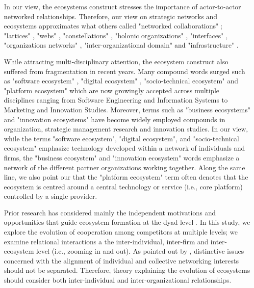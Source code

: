 \documentclass[CHICAGO,Times1COL]{WileyNJDv5} %
\begin{document}
In our view, the ecosystems construct stresses the importance of actor-to-actor networked relationships. Therefore, our view on strategic networks
\citep{jarillo1988strategic,gulati1998alliances,zaheer2000strategic,rusko_2014} and ecosystems \citep{moore1999death,iansiti2004keystone,adner2006match} approximates what
others called "networked collaborations" \citep{normann1993designing}; "lattices" \citep{gore1985lattice}, "webs" \citep{hastings1993new}, "constellations"
\citep{normann1994designing}, "holonic organizations" \citep{mchugh1995beyond}, "interfaces" \citep{gilmore1991innovation}, "organizations networks"
\citep{perrow1972complex}, "inter-organizational domain" \citep{trist1977concept} and "infrastructure" \citep{tilson2010research}.


While attracting multi-disciplinary attention, the ecosystem construct also suffered from fragmentation in recent years. Many compound words surged such as "software ecosystem" \citep{jansen2009sense,jansen2013software}, "digital ecosystem" \citep{eaton2011dynamic},  "socio-technical ecosystem"\citep{ardito2011visual} and  "platform ecosystem" \citep{Tiwana2014} which are now growingly accepted across multiple disciplines ranging from  
Software Engineering and Information Systems to Marketing and Innovation Studies. Moreover, terms such as 
"business ecosystems" \citep{moore1999death,iansiti2004keystone,zahra2012entrepreneurship} and "innovation ecosystems" \citep{adner2015innovation,adner2010value,nambisan2013entrepreneurship,mercier2013innovation}   have become widely employed compounds in organization, strategic management research and innovation studies. In our view,  while the terms "software ecosystem", "digital ecosystem", and "socio-technical ecosystem" emphasize technology developed within a network of individuals and firms, the "business ecosystem" and "innovation ecosystem" words emphasize a network of the different partner organizations working together. Along the same line, we also point our that the "platform ecosystem" term often denotes that the ecosystem is centred around a central technology or service (i.e., core platform) controlled by a single provider.

Prior research has considered mainly the independent motivations and opportunities that guide
ecosystem formation at the dyad-level \citep{lavie_and_singh2012evolution}. In this study, we explore the evolution of cooperation among competitors at multiple levels; we examine relational interactions a the inter-individual, inter-firm and inter-ecosystem level (i.e., zooming in and out). As pointed out by \citet{ibarra_etall_2005}, distinctive issues concerned with the alignment of individual and collective networking interests should not be separated. Therefore, theory explaining the evolution of ecosystems should consider both inter-individual and inter-organizational relationships. 
\end{document}
